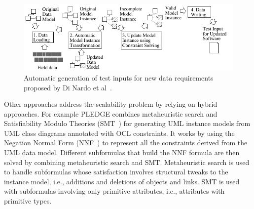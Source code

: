 \begin{figure}[t!]
  \centering
    \includegraphics{images/DiNardoTOSEM}
      \caption{Automatic generation of test inputs for new data requirements proposed by Di Nardo et al~\cite{fig:DiNardo}.}
      \label{fig:DiNardo}
\end{figure}

Other approaches address the scalability problem by relying on hybrid approaches.
For example PLEDGE combines metaheuristic search and Satisfiability Modulo Theories (SMT~\cite{SMT:2011}) for generating UML instance models from UML class diagrams annotated with OCL constraints. It  works by using the Negation Normal Form (NNF~\cite{NNF:2001}) to represent all the constraints derived from the UML data model. Different subformulas that build the NNF formula are then solved by combining metaheuristic search and SMT. Metaheuristic search is used to handle subformulas whose satisfaction involves structural tweaks to the instance model, i.e., additions and deletions of objects and links. SMT is used with subformulas involving only primitive attributes, i.e., attributes with primitive types. 





\endinput


